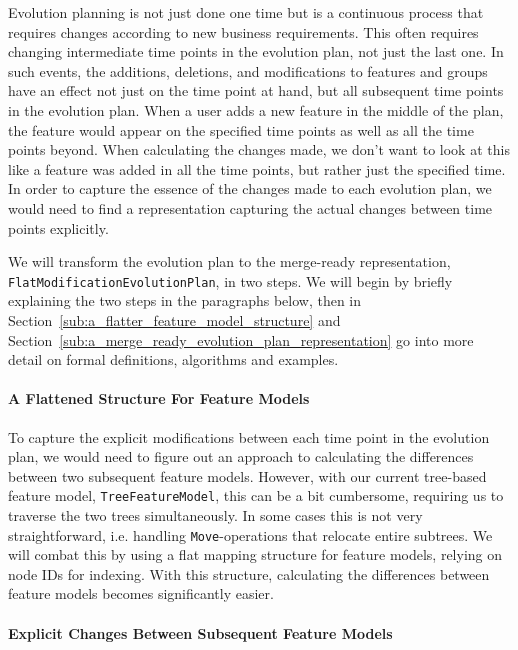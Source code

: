 \documentclass[a4paper,english]{ifimaster}
\begin{document}
Evolution planning is not just done one time but is a continuous process that requires changes according to new business requirements. This often requires changing intermediate time points in the evolution plan, not just the last one. In such events, the additions, deletions, and modifications to features and groups have an effect not just on the time point at hand, but all subsequent time points in the evolution plan. When a user adds a new feature in the middle of the plan, the feature would appear on the specified time points as well as all the time points beyond. When calculating the changes made, we don't want to look at this like a feature was added in all the time points, but rather just the specified time. In order to capture the essence of the changes made to each evolution plan, we would need to find a representation capturing the actual changes between time points explicitly.

We will transform the evolution plan to the merge-ready representation, \texttt{Flat\-Modification\-Evolution\-Plan}, in two steps. We will begin by briefly explaining the two steps in the paragraphs below, then in Section~\vref{sub:a_flatter_feature_model_structure} and Section~\vref{sub:a_merge_ready_evolution_plan_representation} go into more detail on formal definitions, algorithms and examples.

\paragraph{A Flattened Structure For Feature Models}%
\label{par:a_flatter_structure_for_feature_models}

To capture the explicit modifications between each time point in the evolution plan, we would need to figure out an approach to calculating the differences between two subsequent feature models. However, with our current tree-based feature model, \texttt{Tree\-Feature\-Model}, this can be a bit cumbersome, requiring us to traverse the two trees simultaneously. In some cases this is not very straightforward, i.e. handling \texttt{Move}-operations that relocate entire subtrees. We will combat this by using a flat mapping structure for feature models, relying on node IDs for indexing. With this structure, calculating the differences between feature models becomes significantly easier.

\paragraph{Explicit Changes Between Subsequent Feature Models}%
\label{par:explicit_changes_between_subsequent_feature_models}
\end{document}
